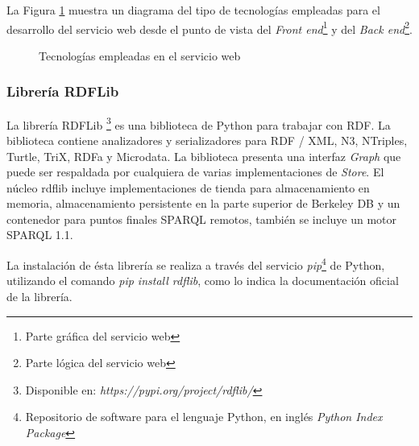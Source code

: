 La Figura \ref{tecnologiasServicio} muestra un diagrama del tipo de tecnolog\'ias empleadas para el desarrollo del servicio web desde el punto de vista del \emph{Front end}\footnote{Parte gr\'afica del servicio web} y del \emph{Back end}\footnote{Parte l\'ogica del servicio web}.

\begin{figure}[!ht]
	\centering
    \caption{Tecnolog\'ias empleadas en el servicio web}
    \label{tecnologiasServicio}
\end{figure}

\subsubsection{Librer\'ia RDFLib}

La librer\'ia RDFLib \footnote{Disponible en: \textit{https://pypi.org/project/rdflib/}} es una biblioteca de Python para trabajar con RDF. La biblioteca contiene analizadores y serializadores para RDF / XML, N3, NTriples, Turtle, TriX, RDFa y Microdata. La biblioteca presenta una interfaz \textit{Graph} que puede ser respaldada por cualquiera de varias implementaciones de \textit{Store}. El n\'ucleo rdflib incluye implementaciones de tienda para almacenamiento en memoria, almacenamiento persistente en la parte superior de Berkeley DB y un contenedor para puntos finales SPARQL remotos, tambi\'en se incluye un motor SPARQL 1.1.\newline

La instalaci\'on de \'esta librer\'ia se realiza a trav\'es del servicio \textit{pip}\footnote{Repositorio de software para el lenguaje Python, en ingl\'es \textit{Python Index Package} } de Python, utilizando el comando \textit{pip install rdflib}, como lo indica la documentaci\'on oficial de la librer\'ia.\newline

